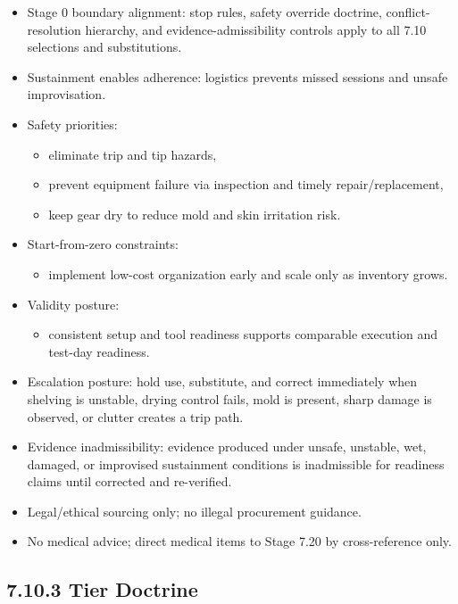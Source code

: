 \documentclass[10pt]{article}
\begin{document}
\begin{itemize}
\item Stage 0 boundary alignment: stop rules, safety override doctrine, conflict-resolution hierarchy, and evidence-admissibility controls apply to all 7.10 selections and substitutions.
\item Sustainment enables adherence: logistics prevents missed sessions and unsafe improvisation.
\item Safety priorities:
  \begin{itemize}
  \item eliminate trip and tip hazards,
  \item prevent equipment failure via inspection and timely repair/replacement,
  \item keep gear dry to reduce mold and skin irritation risk.
  \end{itemize}
\item Start-from-zero constraints:
  \begin{itemize}
  \item implement low-cost organization early and scale only as inventory grows.
  \end{itemize}
\item Validity posture:
  \begin{itemize}
  \item consistent setup and tool readiness supports comparable execution and test-day readiness.
  \end{itemize}
\item Escalation posture: hold use, substitute, and correct immediately when shelving is unstable, drying control fails, mold is present, sharp damage is observed, or clutter creates a trip path.
\item Evidence inadmissibility: evidence produced under unsafe, unstable, wet, damaged, or improvised sustainment conditions is inadmissible for readiness claims until corrected and re-verified.
\item Legal/ethical sourcing only; no illegal procurement guidance.
\item No medical advice; direct medical items to Stage 7.20 by cross-reference only.
\end{itemize}

\subsection*{7.10.3 Tier Doctrine}
{}
\end{document}
